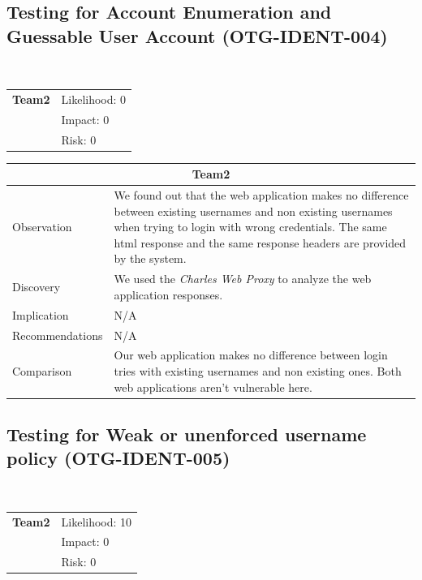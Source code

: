\documentclass[headsepline,footsepline,footinclude=false,oneside,fontsize=11pt,paper=a4,listof=totoc,bibliography=totoc]{scrbook} %
\begin{document}
\pagebreak

\subsection{Testing for Account Enumeration and Guessable User Account (OTG-IDENT-004)}\
\begin{tabular}{cR{12cm}}
	\textbf{Team2} & Likelihood: 0\\& Impact: 0\\& Risk: 0
\end{tabular}

\begin{tabular}{ l|p{11cm}  }
	\hline
	\multicolumn{2}{c}{\textbf{Team2}} \\
	\hline
	Observation   & We found out that the web application makes no difference between existing usernames and non existing usernames when trying to login with wrong credentials. The same html response and the same response headers are provided by the system. \\
	Discovery  & We used the \textit{Charles Web Proxy} to analyze the web application responses. \\
	Implication    & N/A \\
	Recommendations & N/A \\
	Comparison & Our web application makes no difference between login tries with existing usernames and non existing ones. Both web applications aren't vulnerable here. \\
	\hline
\end{tabular}
 
\pagebreak

\subsection{Testing for Weak or unenforced username policy (OTG-IDENT-005)}\
\begin{tabular}{cR{12cm}}
	\textbf{Team2} & Likelihood: 10\\& Impact: 0\\& Risk: 0
\end{tabular}
\end{document}
